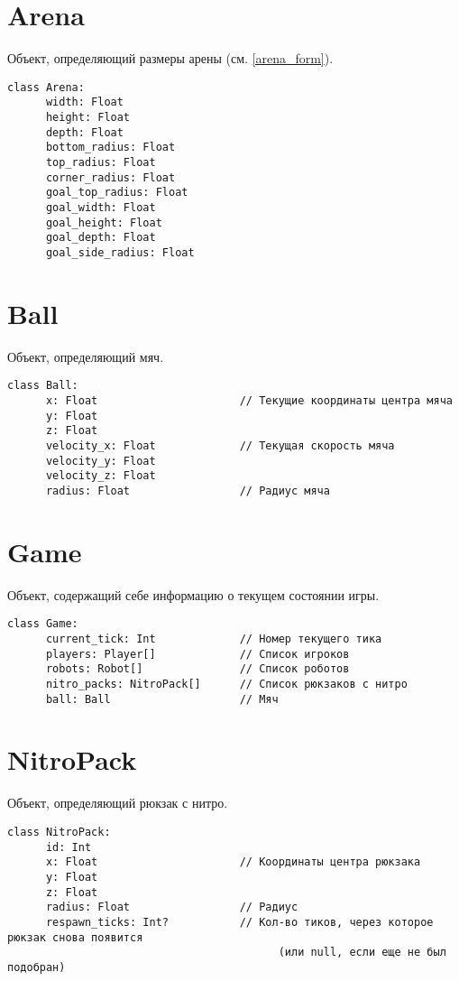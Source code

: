 \section{Arena}

Объект, определяющий размеры арены (см. \ref{arena_form}).

\begin{verbatim}
class Arena:
      width: Float
      height: Float
      depth: Float
      bottom_radius: Float
      top_radius: Float
      corner_radius: Float
      goal_top_radius: Float
      goal_width: Float
      goal_height: Float
      goal_depth: Float
      goal_side_radius: Float
\end{verbatim}

\section{Ball}

Объект, определяющий мяч.

\begin{verbatim}
class Ball:
      x: Float                      // Текущие координаты центра мяча
      y: Float
      z: Float
      velocity_x: Float             // Текущая скорость мяча
      velocity_y: Float
      velocity_z: Float
      radius: Float                 // Радиус мяча
\end{verbatim}

\section{Game}

Объект, содержащий себе информацию о текущем состоянии игры.

\begin{verbatim}
class Game:
      current_tick: Int             // Номер текущего тика
      players: Player[]             // Список игроков
      robots: Robot[]               // Список роботов
      nitro_packs: NitroPack[]      // Список рюкзаков с нитро
      ball: Ball                    // Мяч
\end{verbatim}

\section{NitroPack}

Объект, определяющий рюкзак с нитро.

\begin{verbatim}
class NitroPack:
      id: Int
      x: Float                      // Координаты центра рюкзака
      y: Float
      z: Float
      radius: Float                 // Радиус
      respawn_ticks: Int?           // Кол-во тиков, через которое рюкзак снова появится
                                          (или null, если еще не был подобран)
\end{verbatim}

